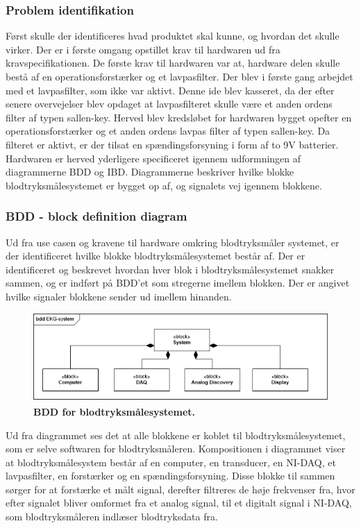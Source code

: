 \subsubsection{Problem identifikation}
Først skulle der identificeres hvad produktet skal kunne, og hvordan det skulle virker. Der er i første omgang opstillet krav til hardwaren ud fra kravspecifikationen. De første krav til hardwaren var at, hardware delen skulle bestå af en operationsforstærker og et lavpasfilter. Der blev i første gang arbejdet med et lavpasfilter, som ikke var aktivt.  Denne ide blev kasseret, da der efter senere overvejelser blev opdaget at lavpasfilteret skulle være et anden ordens filter af typen sallen-key.  Herved blev kredsløbet for hardwaren bygget opefter en operationsforstærker og et anden ordens lavpas filter af typen sallen-key. Da filteret er aktivt, er der tilsat en spændingsforsyning i form af to 9V batterier. \\
Hardwaren er herved yderligere specificeret igennem udformningen af diagrammerne BDD og IBD. Diagrammerne beskriver hvilke blokke blodtryksmålesystemet er bygget op af, og signalets vej igennem blokkene.
\subsubsection{BDD - block definition diagram}
Ud fra use casen og kravene til hardware omkring blodtryksmåler systemet, er der identificeret hvilke blokke blodtryksmålesystemet består af. Der er identificeret og beskrevet hvordan hver blok i blodtryksmålesystemet snakker sammen, og er indført på BDD’et som stregerne imellem blokken. Der er angivet hvilke signaler blokkene sender ud imellem hinanden.  
\begin{figure}[H]
\includegraphics[width =1.0\textwidth , center]{billeder/BDD}
\caption{\textbf{BDD for blodtryksmålesystemet.}}
\end{figure}
Ud fra diagrammet ses det at alle blokkene er koblet til blodtryksmålesystemet, som er selve softwaren for blodtryksmåleren. Kompositionen i diagrammet viser at blodtryksmålesystem består af en computer, en transducer, en NI-DAQ, et lavpasfilter, en forstærker og en spændingsforsyning. Disse blokke til sammen sørger for at forstærke et målt signal, derefter filtreres de høje frekvenser fra, hvor efter signalet bliver omformet fra et analog signal, til et digitalt signal i NI-DAQ, som blodtryksmåleren indlæser blodtryksdata fra. 
